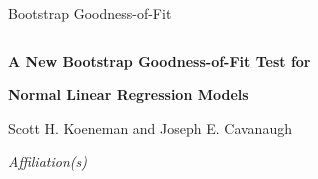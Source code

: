 \documentclass[12pt]{article} %
\theoremstyle{definition}
\begin{document}


\renewcommand{\baselinestretch}{2}


{\hfill {\footnotesize\rm Bootstrap Goodness-of-Fit} \hfill}

\renewcommand{\thefootnote}{}
$\ $\par


\fontsize{12}{14pt plus.8pt minus .6pt}\selectfont \vspace{0.8pc}
\centerline{\large\bf A New Bootstrap Goodness-of-Fit Test for}
\vspace{2pt} 
\centerline{\large\bf Normal Linear Regression Models}
\vspace{.4cm} 
\centerline{Scott H. Koeneman and Joseph E. Cavanaugh} 
\vspace{.4cm} 
\centerline{\it Affiliation(s)}
 \vspace{.55cm} \fontsize{9}{11.5pt plus.8pt minus.6pt}\selectfont

\end{document}
